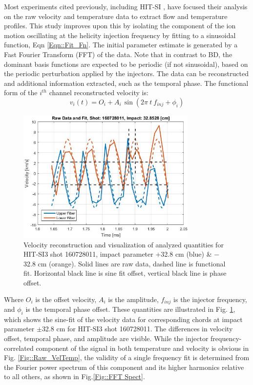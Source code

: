 Most experiments cited previously, including HIT-SI \cite{Hossack_HitSi3}, have focused their analysis on the raw velocity and temperature data to extract flow and temperature profiles. This study improves upon this by isolating the component of the ion motion oscillating at the helicity injection frequency by fitting to a sinusoidal function, Eqn \ref{Eqn::Fit_Fn}. The initial parameter estimate is generated by a Fast Fourier Transform (FFT) of the data. Note that in contrast to BD, the dominant basis functions are expected to be periodic (if not sinusoidal), based on the periodic perturbation applied by the injectors. The data can be reconstructed and additional information extracted, such as the temporal phase. The functional form of the $i^{th}$ channel reconstructed velocity is:
\begin{equation}\label{Eqn::Fit_Fn}
v_i(t)=O_i+A_i\,\mathrm{\sin}(2{\pi}\:t\:f_{inj}+\phi_i)
\end{equation}
\begin{figure}
\includegraphics[width=3.5in]{ReconstExplain}\caption{Velocity reconstruction and visualization of analyzed quantities for HIT-SI3 shot 160728011, impact parameter $+$32.8 cm (blue) \& $-$32.8 cm (orange). Solid lines are raw data, dashed line is functional fit. Horizontal black line is sine fit offset, vertical black line is phase offset.}\label{Fig::Reconst Explain}
\end{figure}
Where $O_i$ is the offset velocity, $A_i$ is the amplitude, $f_{inj}$ is the injector frequency, and $\phi_i$ is the temporal phase offset. These quantities are illustrated in Fig. \ref{Fig::Reconst Explain}, which shows the sine-fit of the velocity data for corresponding chords at impact parameter $\pm$32.8 cm for HIT-SI3 shot 160728011. The differences in velocity offset, temporal phase, and amplitude are visible. While the injector frequency-correlated component of the signal in both temperature and velocity is obvious in Fig. \ref{Fig::Raw_VelTemp}, the validity of a single frequency fit is determined from the Fourier power spectrum of this component and its higher harmonics relative to all others, as shown in Fig.\ref{Fig::FFT Spect}.
